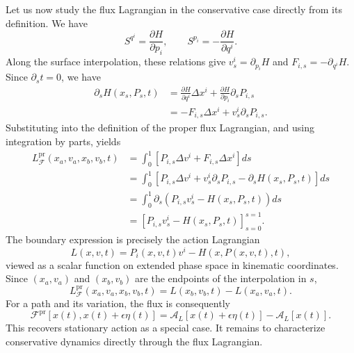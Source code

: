 \documentclass[12pt]{article}
\begin{document}
Let us now study the flux Lagrangian in the conservative case directly from its definition. We have
\begin{equation}
	S^{q^i}=\frac{\partial H}{\partial p_i},
	\qquad
	S^{p_i}=-\frac{\partial H}{\partial q^i}.
\end{equation}
Along the surface interpolation, these relations give
$v_s^i=\partial_{p_i}H$ and $F_{i,s}=-\partial_{q^i}H$.
Since $\partial_s t=0$, we have
\begin{equation}
	\begin{aligned}
		\partial_s H(x_s,P_s,t)
		&=
		\frac{\partial H}{\partial q^i}\Delta x^i
		+
		\frac{\partial H}{\partial p_i}\partial_sP_{i,s}\\
		&=
		-F_{i,s}\Delta x^i
		+v_s^i\partial_sP_{i,s}.
	\end{aligned}
\end{equation}
Substituting into the definition of the proper flux Lagrangian, and using integration by parts, yields
\begin{equation}
	\begin{aligned}
		L_{\mathcal{F}}^{\mathrm{pr}}(x_a,v_a,x_b,v_b,t)
		&=
		\int_0^1
		\left[
		P_{i,s}\Delta v^i+F_{i,s}\Delta x^i
		\right]ds\\
		&=
		\int_0^1
		\left[
		P_{i,s}\Delta v^i
		+v_s^i\partial_sP_{i,s}
		-\partial_s H(x_s,P_s,t)
		\right]ds\\
		&=
		\int_0^1
		\partial_s\left(P_{i,s}v_s^i-H(x_s,P_s,t)\right)ds\\
		&=
		\left[P_{i,s}v_s^i-H(x_s,P_s,t)\right]_{s=0}^{s=1}.
	\end{aligned}
\end{equation}
The boundary expression is precisely the action Lagrangian
\begin{equation}
	L(x,v,t)
	=
	P_i(x,v,t)v^i-H(x,P(x,v,t),t),
\end{equation}
viewed as a scalar function on extended phase space in kinematic coordinates. Since $(x_a,v_a)$ and $(x_b,v_b)$ are the endpoints of the interpolation in $s$, 
\begin{equation}\label{eq:fluxLagrangianDifference}
	L_{\mathcal{F}}^{\mathrm{pr}}(x_a,v_a,x_b,v_b,t)
	=
	L(x_b,v_b,t)-L(x_a,v_a,t).
\end{equation}
For a path and its variation, the flux is consequently
\begin{equation}
	\mathcal{F}^{\mathrm{pr}}[x(t),x(t)+\epsilon\eta(t)]
	=
	\mathcal{A}_L[x(t)+\epsilon\eta(t)]-\mathcal{A}_L[x(t)].
\end{equation}
This recovers stationary action as a special case. It remains to characterize conservative dynamics directly through the flux Lagrangian.
\end{document}
